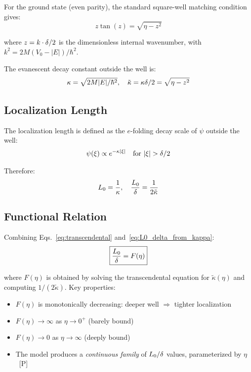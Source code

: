For the ground state (even parity), the standard square-well matching condition
gives:
\begin{equation}
    \boxed{z \tan(z) = \sqrt{\eta - z^2}}
    \label{eq:transcendental}
\end{equation}

where $z = k \cdot \delta/2$ is the dimensionless internal wavenumber, with
$k^2 = 2M(V_0 - |E|)/\hbar^2$.

The evanescent decay constant outside the well is:
\begin{equation}
    \kappa = \sqrt{2M|E|/\hbar^2}, \quad
    \tilde{\kappa} = \kappa \delta/2 = \sqrt{\eta - z^2}
\end{equation}

\subsection{Localization Length}

The localization length is defined as the $e$-folding decay scale of $\psi$
outside the well:
\begin{equation}
    \psi(\xi) \propto e^{-\kappa|\xi|} \quad \text{for } |\xi| > \delta/2
\end{equation}

Therefore:
\begin{equation}
    L_0 = \frac{1}{\kappa}, \quad
    \frac{L_0}{\delta} = \frac{1}{2\tilde{\kappa}}
    \label{eq:L0_delta_from_kappa}
\end{equation}

\subsection{Functional Relation}

Combining Eqs.~\eqref{eq:transcendental} and~\eqref{eq:L0_delta_from_kappa}:
\begin{equation}
    \boxed{\frac{L_0}{\delta} = F(\eta)}
    \label{eq:functional_relation}
\end{equation}

where $F(\eta)$ is obtained by solving the transcendental equation for
$\tilde{\kappa}(\eta)$ and computing $1/(2\tilde{\kappa})$. Key properties:
\begin{itemize}
    \item $F(\eta)$ is monotonically decreasing: deeper well $\Rightarrow$
          tighter localization
    \item $F(\eta) \to \infty$ as $\eta \to 0^+$ (barely bound)
    \item $F(\eta) \to 0$ as $\eta \to \infty$ (deeply bound)
    \item The model produces a \emph{continuous family} of $L_0/\delta$
          values, parameterized by $\eta$~[P]
\end{itemize}


